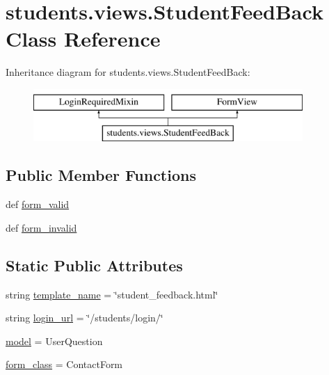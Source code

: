 \hypertarget{classstudents_1_1views_1_1_student_feed_back}{\section{students.\-views.\-Student\-Feed\-Back Class Reference}
\label{classstudents_1_1views_1_1_student_feed_back}
}
Inheritance diagram for students.\-views.\-Student\-Feed\-Back\-:\begin{figure}[H]
\begin{center}
\leavevmode
\includegraphics[height=2.000000cm]{classstudents_1_1views_1_1_student_feed_back}
\end{center}
\end{figure}
\subsection*{Public Member Functions}
\begin{DoxyCompactItemize}
\item 
def \hyperlink{classstudents_1_1views_1_1_student_feed_back_afc5508fe4ca2258556fd31eb7d680694}{form\-\_\-valid}
\item 
def \hyperlink{classstudents_1_1views_1_1_student_feed_back_ab65735dbdc4a51b5fde3228afb3cb062}{form\-\_\-invalid}
\end{DoxyCompactItemize}
\subsection*{Static Public Attributes}
\begin{DoxyCompactItemize}
\item 
string \hyperlink{classstudents_1_1views_1_1_student_feed_back_aba4fdf3ecec134b999393bbd6d402a25}{template\-\_\-name} = \char`\"{}student\-\_\-feedback.\-html\char`\"{}
\item 
string \hyperlink{classstudents_1_1views_1_1_student_feed_back_a1252dc07438b7d8230a4f516e7a52af6}{login\-\_\-url} = \char`\"{}/students/login/\char`\"{}
\item 
\hyperlink{classstudents_1_1views_1_1_student_feed_back_a94d1baf728a44c115ea4950a0caefbce}{model} = User\-Question
\item 
\hyperlink{classstudents_1_1views_1_1_student_feed_back_a98fa33feb41e0851cda2e65f112d4105}{form\-\_\-class} = Contact\-Form
\end{DoxyCompactItemize}


